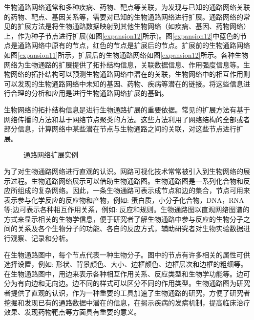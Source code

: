 生物通路网络通常和多种疾病、药物、靶点等关联，为发现与已知的通路网络关联的药物、靶点、基因关系等，需要对已知的生物通路网络进行扩展。通路网络的常见的扩展方法是将生物通路数据映射到其他生物网络（如疾病、基因、药物网络）上，作为种子节点进行扩展(如图\ref{expansion12}所示)。图\ref{expansion12}中蓝色的节点是通路网络中原有的节点，红色的节点是扩展后的节点。扩展前的生物通路网络如图\ref{expansion11}所示，扩展后的生物通路网络如图\ref{expansion12}所示。各种生物网络为生物通路的扩展提供了拓扑结构信息，关联数据信息、作用强度信息等。生物网络的拓扑结构可以预测生物通路网络中潜在的关联，生物网络中的相互作用则可以发现的生物通路网络中未知的基因、药物、疾病等潜在的链接。将这些信息进行合理的分析和应用是进行生物通路网络扩展的基础。

 生物网络的拓扑结构信息是进行生物通路扩展的重要依据。常见的扩展方法有基于网络传播的方法和基于网络节点聚类的方法。这些方法利用了网络结构的全部或者部分信息，计算网络中某些潜在节点与生物通路之间的关联，对这些节点进行扩展。



\begin{figure}
  \centering
  \begin{minipage}{.95\linewidth}
    \setlength{\subfigcapskip}{-1bp}
    \centering
    \begin{minipage}{\textwidth}
      \centering
      \subfigure{\label{expansion11}}\addtocounter{subfigure}{-2}
      \subfigure{\subfigure[扩展前的生物通路网络]{\texttt{[image: 1-a]}}}
      \subfigure{\label{expansion12}}\addtocounter{subfigure}{-2}
      \subfigure{\subfigure[扩展后的生物通路网络]{\texttt{[image: 1-b]}}}
    \end{minipage}
	\caption[fig1]{通路网络扩展实例}
	\label{fig1}
  \end{minipage}
\end{figure}

为了对生物通路网络进行直观的认识。网路可视化技术常常被引入到生物网络的展示过程。生物通路网络展示可以借助生物通路图。生物通路图是一系列化合物和反应所组成的复杂网络。因此，一条生物通路可表示成节点和边的集合，节点可用来表示参与化学反应的反应物和产物，例如: 蛋白质，小分子化合物，DNA，RNA 等;边可表示各种相互作用关系，例如: 反应和规则。生物通路图以直观网络图谱的方式来显示相关的生物学信息，便于研究者了解生物通路中参与反应的生物分子之间的关系及各个生物分子的功能、各自的反应方式，辅助研究者对生物实验数据进行观察、记录和分析。

在生物通路图中，每个节点代表一种生物分子。图中的节点有许多相关的属性可供选择设置，例如: 形状、背景颜色、大小、边框颜色、边框层次和边框的粗细等。在生物通路图中，用边来表示各种相互作用关系、反应类型和生物学功能等。边可分为有向边和无向边。边不同的样式可以区分不同的作用类型。生物通路图为研究者提供了直观的认识，作为一种重要的工具加速了生物通路的研究，方便了研究者挖掘和发现已有的通路数据中潜在的信息，在揭示疾病的发病机制，提高临床治疗效果、发现药物靶点等方面具有重要的意义。

